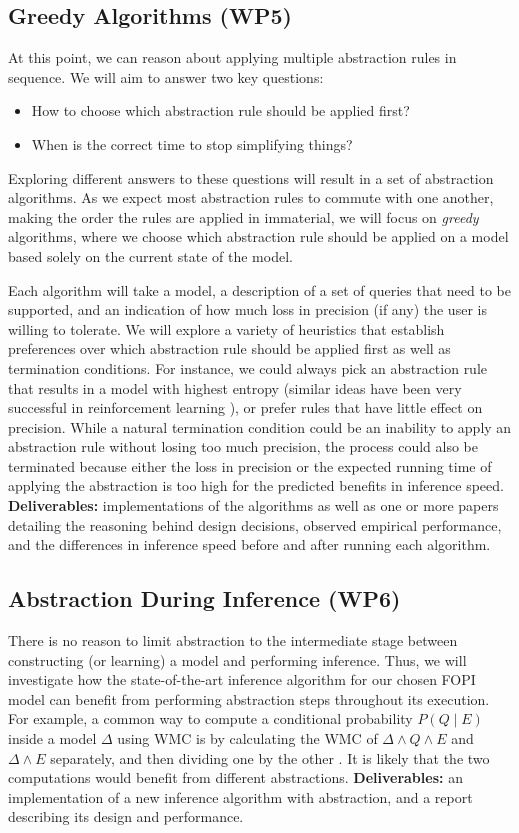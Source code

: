 \documentclass{article}
\begin{document}
\subsection{Greedy Algorithms (WP5)}

At this point, we can reason about applying multiple abstraction rules in
sequence. We will aim to answer two key questions:
\begin{itemize}
\item How to choose which abstraction rule should be applied first?
\item When is the correct time to stop simplifying things?
\end{itemize}
Exploring different answers to these questions will result in a set of
abstraction algorithms. As we expect most abstraction rules to commute with one
another, making the order the rules are applied in immaterial, we will focus on
\emph{greedy} algorithms, where we choose which abstraction rule should be
applied on a model based solely on the current state of the model.

Each algorithm will take a model, a description of a set of queries that need to
be supported, and an indication of how much loss in precision (if any) the user
is willing to tolerate. We will explore a variety of heuristics that establish
preferences over which abstraction rule should be applied first as well as
termination conditions. For instance, we could always pick an abstraction rule
that results in a model with highest entropy (similar ideas have been very
successful in reinforcement learning \cite{DBLP:conf/aaai/ZiebartMBD08}), or
prefer rules that have little effect on precision. While a natural termination
condition could be an inability to apply an abstraction rule without losing too
much precision, the process could also be terminated because either the loss in
precision or the expected running time of applying the abstraction is too high
for the predicted benefits in inference speed. \textbf{Deliverables:}
implementations of the algorithms as well as one or more papers detailing the
reasoning behind design decisions, observed empirical performance, and the
differences in inference speed before and after running each algorithm.

\subsection{Abstraction During Inference (WP6)}

There is no reason to limit abstraction to the intermediate stage between
constructing (or learning) a model and performing inference. Thus, we will
investigate how the state-of-the-art inference algorithm for our chosen FOPI
model can benefit from performing abstraction steps throughout its execution.
For example, a common way to compute a conditional probability $P(Q \mid E)$
inside a model $\Delta$ using WMC is by calculating the WMC of $\Delta \land Q
\land E$ and $\Delta \land E$ separately, and then dividing one by the other
\cite{DBLP:journals/ai/ChaviraD08}. It is likely that the two computations would
benefit from different abstractions. \textbf{Deliverables:} an implementation of a
new inference algorithm with abstraction, and a report describing its design and
performance.
\end{document}
